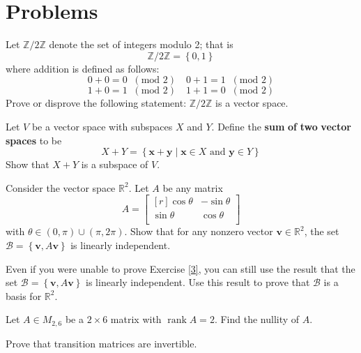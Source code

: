 \documentclass[12pt, letterpaper]{article}
\DeclareMathOperator{\rank}{rank}
\begin{document}
\section{Problems}
\begin{exercise}\label{1}
    Let \(\mathbb{Z}/2\mathbb{Z}\) denote the set of integers modulo 2; that is 
    \[
        \mathbb{Z}/2\mathbb{Z} = \left\{ 0,1 \right\} 
    \]
    where addition is defined as follows:
    \[
        0+0=0\;\;(\text{mod }2 )\quad 0+1=1\;\;(\text{mod }2 )
    \]
    \[
        1+0=1\;\;(\text{mod }2 )\quad 1+1=0\;\;(\text{mod }2 )
    \]
    Prove or disprove the following statement: \(\mathbb{Z}/2\mathbb{Z}\) is a vector space.
\end{exercise}
\begin{exercise}[Subspaces]\label{2}
    Let \(V\) be a vector space with subspaces \(X\) and \(Y\). Define the \textbf{sum} \textbf{of} \textbf{two} \textbf{vector} \textbf{spaces} to be 
    \[
        X+Y = \left\{ \mathbf{x}+\mathbf{y} \mid \mathbf{x}\in X\text{ and }\mathbf{y}\in Y  \right\}
    \]
    Show that \(X+Y\) is a subspace of \(V\).
\end{exercise}
\begin{exercise}\label{3}
    Consider the vector space \(\mathbb{R}^2\). Let \(A\) be any matrix
    \[
        A=\begin{bmatrix}[r]
            \cos \theta  &-\sin \theta    \\
             \sin \theta &\cos \theta    \\
        \end{bmatrix}
    \]
    with \(\theta \in (0,\pi )\cup (\pi ,2\pi )\). Show that for any nonzero vector \(\mathbf{v}\in \mathbb{R}^2\), the set \(\mathcal{B}  =\left\{ \mathbf{v},A \mathbf{v} \right\} \) is linearly independent.
\end{exercise}
\begin{exercise}[Basis]\label{4}
    Even if you were unable to prove Exercise \ref{3}, you can still use the result that the set \(\mathcal{B}  =\left\{ \mathbf{v},A \mathbf{v} \right\} \) is linearly independent. Use this result to prove that \(\mathcal{B} \) is a basis for \(\mathbb{R}^2\).
\end{exercise}
\begin{exercise}\label{5}
    Let \(A\in M_{2,6}\) be a \(2\times 6\) matrix with \(\rank A=2\). Find the nullity of \(A\).
\end{exercise}
\begin{exercise}\label{6}
    Prove that transition matrices are invertible.
\end{exercise}
\end{document}
